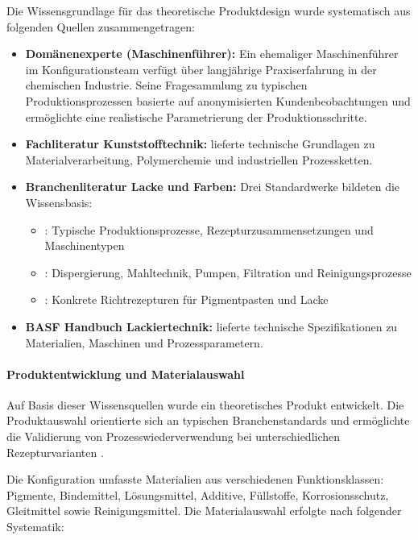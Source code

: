 Die Wissensgrundlage für das theoretische Produktdesign wurde systematisch aus folgenden Quellen zusammengetragen:

\begin{itemize}
    \item \textbf{Domänenexperte (Maschinenführer):} Ein ehemaliger Maschinenführer im Konfigurationsteam verfügt über langjährige Praxiserfahrung in der chemischen Industrie. Seine Fragesammlung zu typischen Produktionsprozessen basierte auf anonymisierten Kundenbeobachtungen und ermöglichte eine realistische Parametrierung der Produktionsschritte.

    \item \textbf{Fachliteratur Kunststofftechnik:} \cite{schwarz:kunststoffkunde1987} lieferte technische Grundlagen zu Materialverarbeitung, Polymerchemie und industriellen Prozessketten.

    \item \textbf{Branchenliteratur Lacke und Farben:} Drei Standardwerke bildeten die Wissensbasis:
    \begin{itemize}
        \item \cite{vci:lacke_farben2018}: Typische Produktionsprozesse, Rezepturzusammensetzungen und Maschinentypen
        \item \cite{brock:lacktechnologie2020}: Dispergierung, Mahltechnik, Pumpen, Filtration und Reinigungsprozesse
        \item \cite{mueller:lackformulierung2017}: Konkrete Richtrezepturen für Pigmentpasten und Lacke
    \end{itemize}

    \item \textbf{BASF Handbuch Lackiertechnik:} \cite{basf:lackiertechnik2019} lieferte technische Spezifikationen zu Materialien, Maschinen und Prozessparametern.
\end{itemize}

\paragraph{Produktentwicklung und Materialauswahl}

Auf Basis dieser Wissensquellen wurde ein theoretisches Produkt entwickelt. Die Produktauswahl orientierte sich an typischen Branchenstandards und ermöglichte die Validierung von Prozesswiederverwendung bei unterschiedlichen Rezepturvarianten \citep{vci:lacke_farben2018, mueller:lackformulierung2017}.

Die Konfiguration umfasste Materialien aus verschiedenen Funktionsklassen: Pigmente, Bindemittel, Lösungsmittel, Additive, Füllstoffe, Korrosionsschutz, Gleitmittel sowie Reinigungsmittel. Die Materialauswahl erfolgte nach folgender Systematik:

